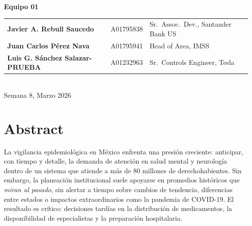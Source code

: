 \documentclass[12pt, letterpaper]{article}
\begin{document}
\begin{titlepage}
\begin{center}
\textbf{\Large Equipo 01}\\[0.4cm]
\begin{tabular}{lll}
\textbf{Javier A. Rebull Saucedo} & A01795838 & Sr.\ Assoc.\ Dev., Santander Bank US \\
\textbf{Juan Carlos Pérez Nava}   & A01795941 & Head of Area, IMSS \\
\textbf{Luis G. Sánchez Salazar-PRUEBA}  & A01232963 & Sr.\ Controls Engineer, Tesla \\
\end{tabular}\\[1.0cm]

{\large Semana 8, Marzo 2026}

\end{center}
\end{titlepage}

\newpage
\tableofcontents
\newpage
\listoffigures
\listoftables
\newpage


\newpage
\section*{Abstract}\label{sec:abstract}

La vigilancia epidemiológica en México enfrenta una presión creciente: anticipar, con tiempo y detalle, la demanda de atención en salud mental y neurología dentro de un sistema que atiende a más de 80 millones de derechohabientes. Sin embargo, la planeación institucional suele apoyarse en promedios históricos que \emph{miran al pasado}, sin alertar a tiempo sobre cambios de tendencia, diferencias entre estados o impactos extraordinarios como la pandemia de COVID-19. El resultado es crítico: decisiones tardías en la distribución de medicamentos, la disponibilidad de especialistas y la preparación hospitalaria.
\end{document}
